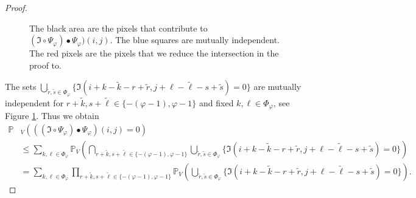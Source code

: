 \documentclass[a4paper,12pt]{article}
\theoremstyle{plain}
\theoremstyle{definition}
\begin{document}
\begin{appendix}
\begin{proof}
		\begin{figure}[t!]
			\centering
			\caption{The black area are the pixels that contribute to $(\mathfrak{I} \circ \Psi_\varphi) \bullet \Psi_\varphi)(i, j)$. The blue squares are mutually independent. The red pixels are the pixels that we reduce the intersection in the proof to.}
			\label{fig: powerindependentpoints}
		\end{figure}
		
		The sets $\bigcup_{\tilde{r}, \tilde{s} \in \Phi_\varphi} \{ \mathfrak{I}(i + k - \tilde{k} - r + \tilde{r}, j + \ell - \tilde{\ell} - s + \tilde{s}) = 0 \}$ are mutually independent for $r + \tilde{k}, s + \tilde{\ell} \in \{ - ( \varphi - 1 ), \varphi - 1 \}$ and fixed $k, \ell \in \Phi_\varphi$, see Figure \ref{fig: powerindependentpoints}. Thus we obtain
		\begin{align*}
			\mathbb{P}&_V\left( ((\mathfrak{I} \circ \Psi_\varphi) \bullet \Psi_\varphi)(i, j) = 0 \right) \\
			&\leq \sum_{k, \ell \in \Phi_\varphi} \mathbb{P}_V\left( \bigcap_{r + \tilde{k}, s + \tilde{\ell} \in \{ - ( \varphi - 1 ), \varphi - 1 \}} \bigcup_{\tilde{r}, \tilde{s} \in \Phi_\varphi} \{ \mathfrak{I}(i + k - \tilde{k} - r + \tilde{r}, j + \ell - \tilde{\ell} - s + \tilde{s}) = 0 \} \right) \\
			&= \sum_{k, \ell \in \Phi_\varphi} \prod_{r + \tilde{k}, s + \tilde{\ell} \in \{ - ( \varphi - 1 ), \varphi - 1 \}} \mathbb{P}_V\left( \bigcup_{\tilde{r}, \tilde{s} \in \Phi_\varphi} \{ \mathfrak{I}(i + k - \tilde{k} - r + \tilde{r}, j + \ell - \tilde{\ell} - s + \tilde{s}) = 0 \} \right).
		\end{align*}
		

\end{proof}
\end{appendix}
\end{document}
